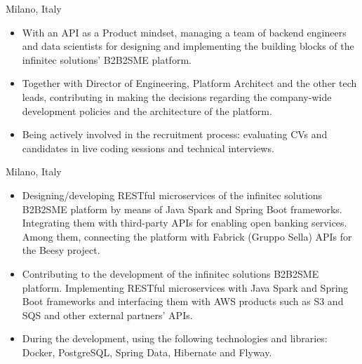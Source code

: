 %
  {Milano, Italy}{}{
\begin{itemize}
  \item With an API as a Product mindset, managing a team of backend engineers
    and data scientists for designing and implementing the building blocks of
    the infinitec solutions' B2B2SME platform.
	\item Together with Director of Engineering, Platform Architect and the other
    tech leads, contributing in making the decisions regarding the company-wide
    development policies and the architecture of the platform.
  \item Being actively involved in the recruitment process: evaluating CVs and
    candidates in live coding sessions and technical interviews.
\end{itemize}
}
%
  {Milano, Italy}{}{
\begin{itemize}
	\item Designing/developing RESTful microservices of the infinitec solutions
    B2B2SME platform by means of Java Spark and Spring Boot frameworks.
    Integrating them with third-party APIs for enabling open banking services.
    Among them, connecting the platform with Fabrick (Gruppo Sella) APIs for the
    Beesy project.
\end{itemize}
}
%
  {}{
\begin{itemize}
	\item Contributing to the development of the infinitec solutions B2B2SME
    platform.
    Implementing RESTful microservices with Java Spark and Spring Boot
    frameworks and interfacing them with AWS products such as S3 and SQS and
    other external partners' APIs.
  \item During the development, using the following technologies and libraries:
    Docker, PostgreSQL, Spring Data, Hibernate and Flyway.
\end{itemize}
}
%
